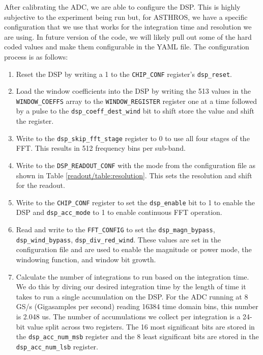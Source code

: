 After calibrating the ADC, we are able to configure the DSP. 
This is highly subjective to the experiment being run but, for ASTHROS, we have a specific configuration that we use that works for the integration time and resolution we are using. 
In future version of the code, we will likely pull out some of the hard coded values and make them configurable in the YAML file.
The configuration process is as follows:
\begin{enumerate}
    \item Reset the DSP by writing a 1 to the \texttt{CHIP\_CONF} register's \texttt{dsp\_reset}.
    \item Load the window coefficients into the DSP by writing the 513 values in the \texttt{WINDOW\_COEFFS} array to the \texttt{WINDOW\_REGISTER} register one at a time followed by a pulse to the \texttt{dsp\_coeff\_dest\_wind} bit to shift store the value and shift the register.
    \item 
        Write to the \texttt{dsp\_skip\_fft\_stage} register to 0 to use all four stages of the FFT. 
        This results in 512 frequency bins per sub-band. 
    \item 
        Write to the \texttt{DSP\_READOUT\_CONF} with the mode from the configuration file as shown in Table \ref{readout/table:resolution}. 
        This sets the resolution and shift for the readout.
    \item 
        Write to the \texttt{CHIP\_CONF} register to set the \texttt{dsp\_enable} bit to 1 to enable the DSP and \texttt{dsp\_acc\_mode} to 1 to enable continuous FFT operation. 
    \item 
        Read and write to the \texttt{FFT\_CONFIG} to set the \texttt{dsp\_magn\_bypass}, \texttt{dsp\_wind\_bypass}, \texttt{dsp\_div\_red\_wind}. 
        These values are set in the configuration file and are used to enable the magnitude or power mode, the windowing function, and window bit growth. 
    \item 
        Calculate the number of integrations to run based on the integration time. 
        We do this by diving our desired integration time by the length of time it takes to run a single accumulation on the DSP. 
        For the ADC running at 8 GS/s (Gigasamples per second) reading 16384 time domain bins, this number is 2.048 us.
        The number of accumulations we collect per integration is a 24-bit value split across two registers. 
        The 16 most significant bits are stored in the \texttt{dsp\_acc\_num\_msb} register and the 8 least significant bits are stored in the \texttt{dsp\_acc\_num\_lsb} register.

\end{enumerate}
